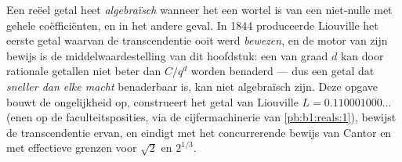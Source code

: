 \begin{problem}
\label{pb:b1:derivative:1}
Een reëel getal heet \emph{algebraïsch} wanneer het een wortel is
van een niet-nulle  met gehele coëfficiënten, en
\emph{} in het andere geval. In 1844 produceerde
Liouville het eerste getal waarvan de transcendentie ooit werd
\emph{bewezen}, en de motor van zijn bewijs is de
middelwaardestelling van dit hoofdstuk: een  van
graad $d$ kan door rationale getallen niet beter dan $C/q^d$
worden benaderd --- dus een getal dat \emph{sneller dan elke
macht} benaderbaar is, kan niet algebraïsch zijn. Deze opgave
bouwt de ongelijkheid op, construeert het getal van Liouville $L =
0.110001000\dots$ (enen op de faculteitsposities, via de
cijfermachinerie van \cref{pb:b1:reals:1}), bewijst de
transcendentie ervan, en eindigt met het concurrerende bewijs van
Cantor en met effectieve grenzen voor $\sqrt2$ en
$2^{1/3}$.


\end{problem}
